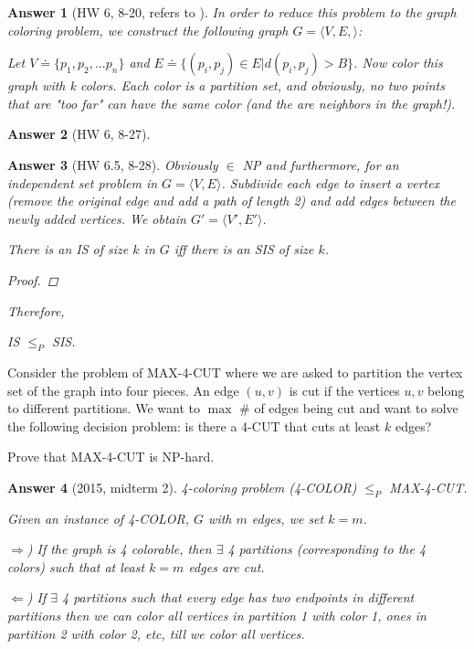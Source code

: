 \documentclass[11pt]{article}
\theoremstyle{numberplain}
\theoremstyle{nonumberplain}
\newtheorem{proof}{Proof}
\newtheorem{ans}{Answer}
\newcommand{\0}{{\mathbf{0}}}
\begin{document}
\begin{ans}[HW 6, 8-20, refers to \cite{yahoo8_20answer}]
In order to reduce this problem to the graph coloring problem, we construct the following graph $G=\langle V,E,\rangle$: 


Let $V\doteq\{p_1, p_2, ... p_n\}$ and $E\doteq\{(p_i,p_j)\in E | d(p_i, p_j) > B\}$. Now color this graph with k colors. Each color is a partition set, and obviously, no two points that are "too far" can have the same color (and the are neighbors in the graph!). 
\end{ans}

\begin{ans}[HW 6, 8-27] 
\end{ans}
\begin{ans}[HW 6.5, 8-28] Obviously $\in$ NP and furthermore, for an independent set problem in $G=\langle V, E\rangle$. Subdivide each edge to insert a vertex (remove
the original edge and add a path of length 2) and add edges between the newly added vertices. We obtain $G'=\langle V', E'\rangle$.
\begin{State}[Claim 1] There is an IS of size $k$ in $G$ iff there is an SIS of size $k$.
\end{State}
\begin{proof}
\end{proof}
Therefore,
\begin{State}[Claim 2]
IS $\leq_P$ SIS.
\end{State}
\end{ans}

\begin{ques}[2015, midterm 2] Consider the problem of MAX-4-CUT where we are asked to partition the vertex set of the graph into four pieces. An edge $(u,v)$ is cut if the vertices $u,v$ belong to different partitions. We want to $\max$ \# of edges being cut and want to solve the following decision problem: is there a 4-CUT that cuts at least $k$ edges?

Prove that MAX-4-CUT is NP-hard.
\end{ques}
\begin{ans}[2015, midterm 2] 4-coloring problem (4-COLOR) $\leq_P$ MAX-4-CUT.

Given an instance of 4-COLOR, $G$ with $m$ edges, we set $k=m$. 

$\Rightarrow$) If the graph is 4 colorable, then $\exists$ 4 partitions (corresponding to the 4 colors) such that at least $k=m$ edges are cut.

$\Leftarrow$) If $\exists$ 4 partitions such that every edge has two endpoints in different partitions then we can color all vertices in partition 1 with color 1, ones in partition 2 with color 2, etc, till we color all vertices. 
\end{ans}
\end{document}
